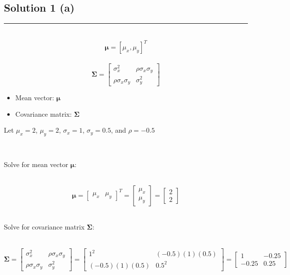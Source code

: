 \documentclass{article}
\begin{document}
\pagestyle{fancy}

\subsection*{Solution 1 (a)}

\noindent\rule{\textwidth}{0.4pt}\\

$$\boldsymbol{\mu} = [\mu_x, \mu_y]^T$$\\
$$\boldsymbol{\Sigma} = \begin{bmatrix} \sigma_x^2 & \rho\sigma_x\sigma_y \\ \rho\sigma_x\sigma_y & \sigma_y^2 \end{bmatrix}$$

\begin{itemize}
    \item Mean vector: $\boldsymbol{\mu}$
    \item Covariance matrix: $\boldsymbol{\Sigma}$
\end{itemize}

\parbox{\textwidth}{Let $\mu_x = 2$, $\mu_y = 2$, $\sigma_x = 1$, $\sigma_y = 0.5$, and $\rho = -0.5$}\\

\parbox{\textwidth}{Solve for mean vector $\boldsymbol{\mu}$:}\\

$$\boldsymbol{\mu} = \begin{bmatrix} \mu_x & \mu_y \end{bmatrix}^T = \begin{bmatrix}
    \mu_x \\
    \mu_y
\end{bmatrix} = \begin{bmatrix}
    2 \\
    2
\end{bmatrix}$$\\

\parbox{\textwidth}{Solve for covariance matrix $\boldsymbol{\Sigma}$:}\\

$$\boldsymbol{\Sigma} = \begin{bmatrix} \sigma_x^2 & \rho\sigma_x\sigma_y \\ \rho\sigma_x\sigma_y & \sigma_y^2 \end{bmatrix} = \begin{bmatrix} 1^2 & (-0.5)(1)(0.5) \\(-0.5)(1)(0.5) & 0.5^2\end{bmatrix} = \begin{bmatrix} 1 & -0.25 \\-0.25 & 0.25\end{bmatrix}$$\\
\end{document}
